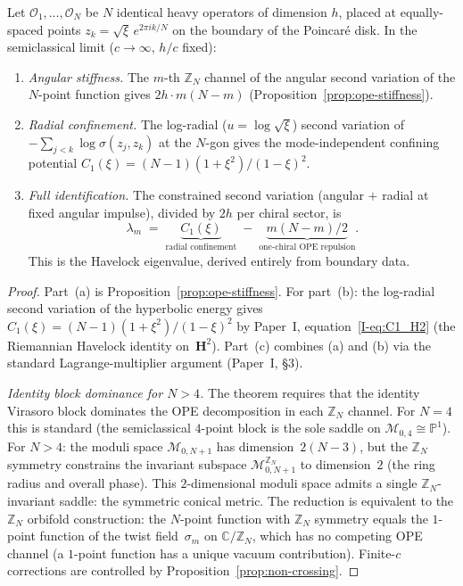 \begin{theorem}[$\mathbb{Z}_N$ conformal block $=$ Havelock eigenvalue]
\label{thm:block-havelock}
Let $\mathcal{O}_1, \ldots, \mathcal{O}_N$ be $N$ identical heavy
operators of dimension $h$, placed at equally-spaced points
$z_k = \sqrt{\xi}\,e^{2\pi ik/N}$ on the boundary of the
Poincar\'e disk.
In the semiclassical limit ($c \to \infty$, $h/c$ fixed):
\begin{enumerate}
\item[\emph{(a)}] \emph{Angular stiffness.}
  The $m$-th $\mathbb{Z}_N$ channel of the angular second
  variation of the $N$-point function gives
  $2h\cdot m(N{-}m)$
  (Proposition~\ref{prop:ope-stiffness}).
\item[\emph{(b)}] \emph{Radial confinement.}
  The log-radial ($u = \log\!\sqrt{\xi}$) second variation
  of $-\sum_{j<k}\!\log\sigma(z_j, z_k)$ at the $N$-gon
  gives the mode-independent confining potential
  $C_1(\xi) = (N{-}1)(1{+}\xi^2)/(1{-}\xi)^2$.
\item[\emph{(c)}] \emph{Full identification.}
  The constrained second variation
  (angular $+$ radial at fixed angular impulse), divided
  by $2h$ per chiral sector, is
  \begin{equation}\label{eq:block-equals-havelock}
    \lambda_m \;=\;
    \underbrace{C_1(\xi)}_{\text{radial confinement}}
    \;-\;
    \underbrace{m(N{-}m)/2}_{\text{one-chiral OPE repulsion}}.
  \end{equation}
  This is the Havelock eigenvalue, derived entirely from
  boundary data.
\end{enumerate}
\end{theorem}

\begin{proof}
Part~(a) is Proposition~\ref{prop:ope-stiffness}.
For part~(b): the log-radial second variation of the
hyperbolic energy gives
$C_1(\xi) = (N{-}1)(1{+}\xi^2)/(1{-}\xi)^2$
by Paper~I, equation~\ref*{I-eq:C1_H2}
(the Riemannian Havelock identity on~$\mathbf{H}^2$).
Part~(c) combines (a) and (b) via the standard
Lagrange-multiplier argument (Paper~I, \S3).

\emph{Identity block dominance for $N > 4$.}
The theorem requires that the identity Virasoro block dominates the
OPE decomposition in each $\mathbb{Z}_N$ channel.
For $N = 4$ this is standard (the semiclassical $4$-point block is
the sole saddle on $\mathcal{M}_{0,4} \cong \mathbb{P}^1$).
For $N > 4$: the moduli space $\mathcal{M}_{0,N+1}$ has
dimension~$2(N{-}3)$, but the $\mathbb{Z}_N$ symmetry constrains
the invariant subspace $\mathcal{M}_{0,N+1}^{\mathbb{Z}_N}$
to dimension~$2$ (the ring radius and overall phase).
This $2$-dimensional moduli space admits a single
$\mathbb{Z}_N$-invariant saddle: the symmetric conical metric.
The reduction is equivalent to the $\mathbb{Z}_N$ orbifold
construction: the $N$-point function with $\mathbb{Z}_N$ symmetry
equals the $1$-point function of the twist field~$\sigma_m$ on
$\mathbb{C}/\mathbb{Z}_N$, which has no competing OPE channel
(a $1$-point function has a unique vacuum contribution).
Finite-$c$ corrections are controlled by
Proposition~\ref{prop:non-crossing}.
\end{proof}

